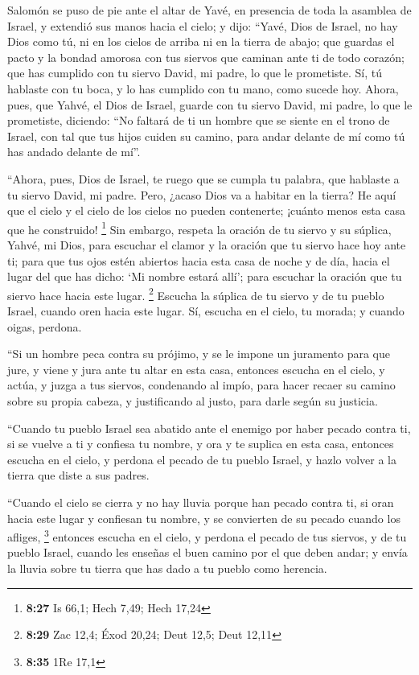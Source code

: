  Salomón se puso de pie ante el altar de Yavé, en
presencia de toda la asamblea de Israel, y extendió sus manos hacia el
cielo;  y dijo: ``Yavé, Dios de Israel, no hay Dios como
tú, ni en los cielos de arriba ni en la tierra de abajo; que guardas el
pacto y la bondad amorosa con tus siervos que caminan ante ti de todo
corazón;  que has cumplido con tu siervo David, mi padre,
lo que le prometiste. Sí, tú hablaste con tu boca, y lo has cumplido con
tu mano, como sucede hoy.  Ahora, pues, que Yahvé, el
Dios de Israel, guarde con tu siervo David, mi padre, lo que le
prometiste, diciendo: ``No faltará de ti un hombre que se siente en el
trono de Israel, con tal que tus hijos cuiden su camino, para andar
delante de mí como tú has andado delante de mí''.

 ``Ahora, pues, Dios de Israel, te ruego que se cumpla tu
palabra, que hablaste a tu siervo David, mi padre.  Pero,
¿acaso Dios va a habitar en la tierra? He aquí que el cielo y el cielo
de los cielos no pueden contenerte; ¡cuánto menos esta casa que he
construido! \footnote{\textbf{8:27} Is 66,1; Hech 7,49; Hech 17,24}
 Sin embargo, respeta la oración de tu siervo y su
súplica, Yahvé, mi Dios, para escuchar el clamor y la oración que tu
siervo hace hoy ante ti;  para que tus ojos estén
abiertos hacia esta casa de noche y de día, hacia el lugar del que has
dicho: `Mi nombre estará allí'; para escuchar la oración que tu siervo
hace hacia este lugar. \footnote{\textbf{8:29} Zac 12,4; Éxod 20,24;
  Deut 12,5; Deut 12,11}  Escucha la súplica de tu siervo
y de tu pueblo Israel, cuando oren hacia este lugar. Sí, escucha en el
cielo, tu morada; y cuando oigas, perdona.

 ``Si un hombre peca contra su prójimo, y se le impone un
juramento para que jure, y viene y jura ante tu altar en esta casa,
 entonces escucha en el cielo, y actúa, y juzga a tus
siervos, condenando al impío, para hacer recaer su camino sobre su
propia cabeza, y justificando al justo, para darle según su justicia.

 ``Cuando tu pueblo Israel sea abatido ante el enemigo
por haber pecado contra ti, si se vuelve a ti y confiesa tu nombre, y
ora y te suplica en esta casa,  entonces escucha en el
cielo, y perdona el pecado de tu pueblo Israel, y hazlo volver a la
tierra que diste a sus padres.

 ``Cuando el cielo se cierra y no hay lluvia porque han
pecado contra ti, si oran hacia este lugar y confiesan tu nombre, y se
convierten de su pecado cuando los afliges, \footnote{\textbf{8:35} 1Re
  17,1}  entonces escucha en el cielo, y perdona el
pecado de tus siervos, y de tu pueblo Israel, cuando les enseñas el buen
camino por el que deben andar; y envía la lluvia sobre tu tierra que has
dado a tu pueblo como herencia.

